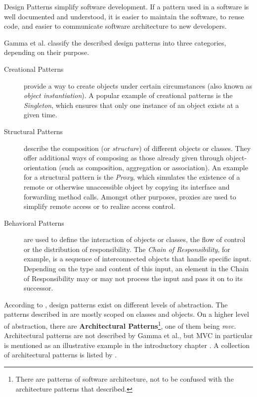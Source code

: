Design Patterns simplify software development. If a pattern used in a software is well documented and understood, it is easier to maintain the software, to reuse code, and easier to communicate software architecture to new developers.

Gamma et al. classify the described design patterns into three categories, depending on their purpose.

\begin{description}
	\item[Creational Patterns] provide a way to create objects under certain circumstances (also known as \emph{object instantiation}).
	A popular example of creational patterns is the \emph{Singleton}, which ensures that only one instance of an object exists at a given time.
	\item[Structural Patterns] describe the composition (or \emph{structure}) of different objects or classes. They offer additional ways of composing as those already given through object-orientation (such as composition, aggregation or association). An example for a structural pattern is the \emph{Proxy}, which simulates the existence of a remote or otherwise unaccessible object by copying its interface and forwarding method calls. Amongst other purposes, proxies are used to simplify remote access or to realize access control.
	\item[Behavioral Patterns] are used to define the interaction of objects or classes, the flow of control or the distribution of responsibility. The \emph{Chain of Responsibility}, for example, is a sequence of interconnected objects that handle specific input. Depending on the type and content of this input, an element in the Chain of Responsibility may or may not process the input and pass it on to its successor.
\end{description}
According to , design patterns exist on different levels of abstraction. The patterns described in  are mostly scoped on classes and objects. On a higher level of abstraction, there are \textbf{Architectural Patterns}\footnote{There are patterns of software architecture, not to be confused with the architecture patterns that  described.}, one of them being \emph{\acl{mvc}}. Architectural patterns are not described by Gamma et al., but MVC in particular is mentioned as an illustrative example in the introductory chapter \citeyear[p. 4--6]{gof}. A collection of architectural patterns is listed by .

